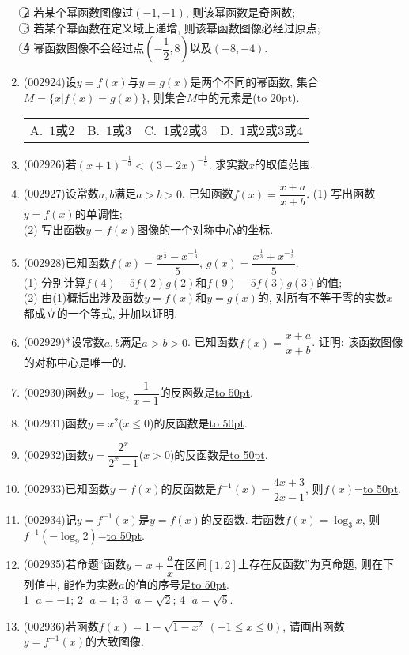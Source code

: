 \documentclass[10pt,a4paper]{article}
\newcommand{\blank}[1]{\underline{\hbox to #1pt{}}}
\newcommand{\bracket}[1]{(\hbox to #1pt{})}
\newcommand{\fourch}[4]{\par\begin{tabular}{p{.23\textwidth}p{.23\textwidth}p{.23\textwidth}p{.23\textwidth}}
A.~#1 &B.~#2& C.~#3& D.~#4
\end{tabular}}
\begin{document}
\begin{enumerate}[1.]
\textcircled{2} 若某个幂函数图像过$(-1,-1)$, 则该幂函数是奇函数;\\
\textcircled{3} 若某个幂函数在定义域上递增, 则该幂函数图像必经过原点;\\
\textcircled{4} 幂函数图像不会经过点$(-\dfrac 12,8)$以及$(-8,-4)$.
\item {\tiny (002924)}设$y=f(x)$与$y=g(x)$是两个不同的幂函数, 集合$M=\{x|f(x)=g(x)  \}$, 则集合$M$中的元素是\bracket{20}.
\fourch{$1$或$2$}{$1$或$3$}{$1$或$2$或$3$}{$1$或$2$或$3$或$4$}
\item {\tiny (002926)}若$(x+1)^{-\frac 13}<(3-2x)^{-\frac 13}$, 求实数$x$的取值范围.
\item {\tiny (002927)}设常数$a,b$满足$a>b>0$. 已知函数$f(x)=\dfrac{x+a}{x+b}$.
(1) 写出函数$y=f(x)$的单调性;\\
(2) 写出函数$y=f(x)$图像的一个对称中心的坐标.
\item {\tiny (002928)}已知函数$f(x)=\dfrac{x^{\frac 13}-x^{-\frac 13}}5$, $g(x)=\dfrac{x^{\frac 13}+x^{-\frac 13}}5$.\\
(1) 分别计算$f(4)-5f(2)g(2)$和$f(9)-5f(3)g(3)$的值;\\
(2) 由(1)概括出涉及函数$y=f(x)$和$y=g(x)$的, 对所有不等于零的实数$x$都成立的一个等式, 并加以证明.
\item {\tiny (002929)}*设常数$a,b$满足$a>b>0$. 已知函数$f(x)=\dfrac{x+a}{x+b}$. 证明: 该函数图像的对称中心是唯一的.
\item {\tiny (002930)}函数$y=\log_2 \dfrac 1{x-1}$的反函数是\blank{50}.
\item {\tiny (002931)}函数$y=x^2$($x\le 0$)的反函数是\blank{50}.
\item {\tiny (002932)}函数$y=\dfrac{2^x}{{2^x}-1}$($x>0$)的反函数是\blank{50}.
\item {\tiny (002933)}已知函数$y=f(x)$的反函数是$f^{-1}(x)=\dfrac{4x+3}{2x-1}$, 则$f(x)$=\blank{50}.
\item {\tiny (002934)}记$y=f^{-1}(x)$是$y=f(x)$的反函数. 若函数$f(x)=\log_3x$, 则$f^{-1}(-\log_9 2)$=\blank{50}.
\item {\tiny (002935)}若命题``函数$y=x+\dfrac ax$在区间$[1,2]$上存在反函数''为真命题, 则在下列值中, 能作为实数$a$的值的序号是\blank{50}.\\
\textcircled{1} $a=-1$; \textcircled{2} $a=1$; \textcircled{3} $a=\sqrt 2$; \textcircled{4} $a=\sqrt 5$.
\item {\tiny (002936)}若函数$f(x)=1-\sqrt{1-x^2}\ (-1\le x\le 0)$,
请画出函数$y={f^{-1}}(x)$的大致图像.
\begin{center}
    \begin{tikzpicture}[>=latex,scale =1.8]

\end{tikzpicture}
\end{center}
\end{enumerate}
\end{document}
